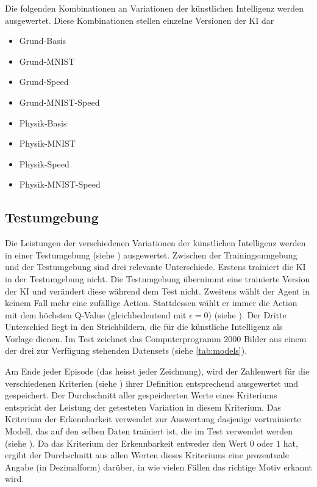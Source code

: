 Die folgenden Kombinationen an Variationen der künstlichen Intelligenz werden
ausgewertet. Diese Kombinationen stellen einzelne Versionen der KI dar
\begin{itemize}
  \item Grund-Basis
  \item Grund-MNIST
  \item Grund-Speed
  \item Grund-MNIST-Speed 
  \item Physik-Basis
  \item Physik-MNIST
  \item Physik-Speed
  \item Physik-MNIST-Speed
\end{itemize}

\subsection{Testumgebung}\label{sub:m_auswert_test} Die Leistungen der
verschiedenen Variationen der künstlichen Intelligenz werden in einer
Testumgebung (siehe ) ausgewertet. Zwischen der
Trainingsumgebung und der Testumgebung sind drei relevante Unterschiede. Erstens
trainiert die KI in der Testumgebung nicht. Die Testumgebung übernimmt eine
trainierte Version der KI und verändert diese während dem Test nicht. Zweitens
wählt der Agent in keinem Fall mehr eine zufällige Action. Stattdessen wählt er
immer die Action mit dem höchsten Q-Value (gleichbedeutend mit $\epsilon = 0$)
(siehe ). Der Dritte Unterschied liegt in den
Strichbildern, die für die künstliche Intelligenz als Vorlage dienen. Im Test
zeichnet das Computerprogramm $2000$ Bilder aus einem der drei zur Verfügung
stehenden Datensets (siehe \autoref{tab:models}). 

Am Ende jeder Episode (das heisst jeder Zeichnung), wird der Zahlenwert für die
verschiedenen Kriterien (siehe ) ihrer Definition
entsprechend ausgewertet und gespeichert. Der Durchschnitt aller gespeicherten
Werte eines Kriteriums entspricht der Leistung der getesteten Variation in
diesem Kriterium. Das Kriterium der Erkennbarkeit verwendet zur Auswertung
dasjenige vortrainierte Modell, das auf den selben Daten trainiert ist, die im
Test verwendet werden (siehe ). Da das Kriterium der
Erkennbarkeit entweder den Wert $0$ oder $1$ hat, ergibt der Durchschnitt aus
allen Werten dieses Kriteriums eine prozentuale Angabe (in Dezimalform) darüber,
in wie vielen Fällen das richtige Motiv erkannt wird.



